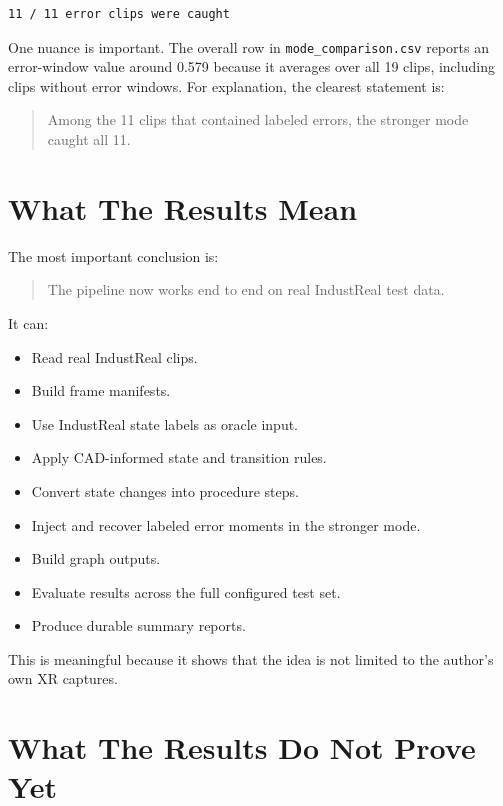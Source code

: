 \documentclass[11pt,a4paper]{article}
\begin{document}
\begin{lstlisting}
11 / 11 error clips were caught
\end{lstlisting}

One nuance is important. The overall row in \texttt{mode\_comparison.csv} reports an error-window value around 0.579 because it averages over all 19 clips, including clips without error windows. For explanation, the clearest statement is:

\begin{quote}
Among the 11 clips that contained labeled errors, the stronger mode caught all 11.
\end{quote}

\section{What The Results Mean}

The most important conclusion is:

\begin{quote}
The pipeline now works end to end on real IndustReal test data.
\end{quote}

It can:

\begin{itemize}[leftmargin=*]
    \item Read real IndustReal clips.
    \item Build frame manifests.
    \item Use IndustReal state labels as oracle input.
    \item Apply CAD-informed state and transition rules.
    \item Convert state changes into procedure steps.
    \item Inject and recover labeled error moments in the stronger mode.
    \item Build graph outputs.
    \item Evaluate results across the full configured test set.
    \item Produce durable summary reports.
\end{itemize}

This is meaningful because it shows that the idea is not limited to the author's own XR captures.

\section{What The Results Do Not Prove Yet}
\end{document}
